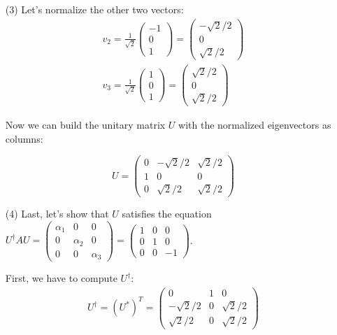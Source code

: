\documentclass[12pt]{article}
\begin{document}
\begin{enumerate}
\item[(3)]
Let's normalize the other two vectors:
\begin{gather*}
    v_2 = \frac{1}{\sqrt{2}}
    \begin{pmatrix}
        -1 \\ 0 \\ 1
    \end{pmatrix} 
    = 
    \begin{pmatrix}
        -\sqrt{2}/2 \\ 0 \\ \sqrt{2}/2
    \end{pmatrix} 
    \\
    v_3 = \frac{1}{\sqrt{2}}
    \begin{pmatrix}
        1 \\ 0 \\ 1
    \end{pmatrix}
    = 
    \begin{pmatrix}
        \sqrt{2}/2 \\ 0 \\ \sqrt{2}/2
    \end{pmatrix} 
\end{gather*}

Now we can build the unitary matrix $U$ with the normalized eigenvectors 
as columns:

\[
U =
\begin{pmatrix}
    0 & -\sqrt{2}/2 & \sqrt{2}/2 \\
    1 & 0 & 0 \\
    0 & \sqrt{2}/2 & \sqrt{2}/2
\end{pmatrix}
\]

\item[(4)]
Last, let's show that $U$ satisfies the equation $U^\dagger A U =
\begin{pmatrix}
    \alpha_1 & 0 & 0 \\ 0 & \alpha_2 & 0 \\ 0 & 0 & \alpha_3
\end{pmatrix}
= 
\begin{pmatrix}
    1 & 0 & 0 \\ 0 & 1 & 0 \\ 0 & 0 & -1
\end{pmatrix}
$.

First, we have to compute $U^\dagger$:
\begin{gather*}
    U^\dagger = (U^*)^T = 
    \begin{pmatrix}
        0 & 1 & 0 \\
        -\sqrt{2}/2 & 0 & \sqrt{2}/2 \\
        \sqrt{2}/2 & 0 & \sqrt{2}/2
    \end{pmatrix}       
\end{gather*}


\end{enumerate}
\end{document}
